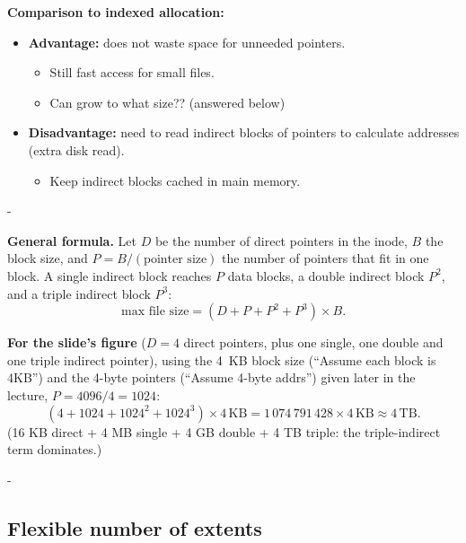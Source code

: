 \documentclass[11pt,a4paper]{article}
\makeatletter
\newcommand{\keepspace}[1]{\par\penalty-100\begingroup
  \setlength{\dimen@}{#1}\dimen@ii\pagegoal\advance\dimen@ii-\pagetotal
  \ifdim\dimen@>\dimen@ii\ifdim\dimen@ii>\z@\vfil\fi\break\fi\endgroup}
\makeatother
\begin{document}
\noindent\textbf{Comparison to indexed allocation:}
\begin{itemize}
  \item \textbf{Advantage:} does not waste space for unneeded pointers.
  \begin{itemize}
    \item Still fast access for small files.
    \item Can grow to what size?? (answered below)
  \end{itemize}
  \item \textbf{Disadvantage:} need to read indirect blocks of pointers to
        calculate addresses (extra disk read).
  \begin{itemize}
    \item Keep indirect blocks cached in main memory.
  \end{itemize}
\end{itemize}

\keepspace{14\baselineskip}
\begin{solbox}
\textbf{General formula.} Let \(D\) be the number of direct pointers in the
inode, \(B\) the block size, and \(P = B/(\text{pointer size})\) the number of
pointers that fit in one block. A single indirect block reaches \(P\) data
blocks, a double indirect block \(P^2\), and a triple indirect block \(P^3\):
\[
\text{max file size} = (D + P + P^2 + P^3)\times B .
\]

\textbf{For the slide's figure} (\(D = 4\) direct pointers, plus one single,
one double and one triple indirect pointer), using the 4~KB block size
(``Assume each block is 4KB'') and the 4-byte pointers (``Assume 4-byte
addrs'') given later in the lecture, \(P = 4096/4 = 1024\):
\[
(4 + 1024 + 1024^2 + 1024^3)\times 4\,\text{KB}
= 1\,074\,791\,428 \times 4\,\text{KB} \approx 4\,\text{TB}.
\]
(16 KB direct + 4 MB single + 4 GB double + 4 TB triple: the triple-indirect
term dominates.)
\end{solbox}

\keepspace{8\baselineskip}
\subsection{Flexible number of extents}
\end{document}
